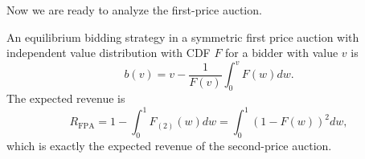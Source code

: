 Now we are ready to analyze the first-price auction. 

\begin{proposition}
	An equilibrium bidding strategy in a symmetric first price auction with independent value distribution with CDF $F$ for a bidder with value $v$ is \[
		b(v) = v - \frac{1}{F(v)} \int_{0}^{v} F(w)dw 
	.\] 
	The expected revenue is \[
		R_{\text{FPA}} = 1 - \int_{0}^{1} F_{(2)}(w)dw = \int_{0}^{1} \left( 1-F(w) \right)^2dw 
	,\] 
	which is exactly the expected revenue of the second-price auction.
\end{proposition}

